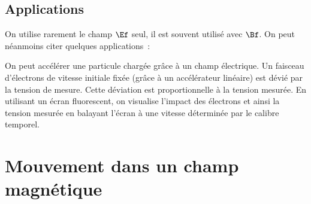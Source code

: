\documentclass[../main/main.tex]{subfiles}
\begin{document}
\subsection{Applications}
On utilise rarement le champ $\Ef$ seul, il est souvent utilisé avec $\Bf$. On
peut néanmoins citer quelques applications~:
\begin{itemize}[label=$\diamond$]
     On peut accélérer une particule chargée grâce
        à un champ électrique.
     Un faisceau d'électrons de vitesse initiale
        fixée (grâce à un accélérateur linéaire) est dévié par la tension de
        mesure. Cette déviation est proportionnelle à la tension mesurée. En
        utilisant un écran fluorescent, on visualise l'impact des électrons et
        ainsi la tension mesurée en balayant l'écran à une vitesse déterminée
        par le calibre temporel.
\end{itemize}

\section{Mouvement dans un champ magnétique}
\end{document}
